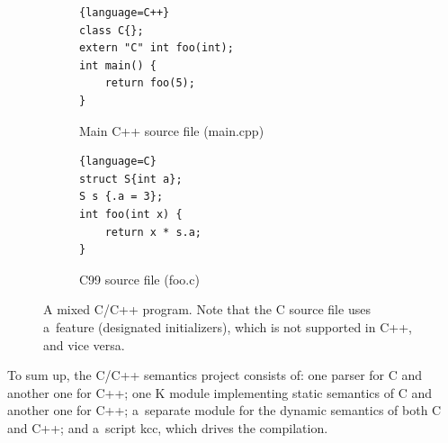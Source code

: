 \documentclass{fithesis3}
\begin{document}
\begin{figure}
\centering
\begin{subfigure}{.5\textwidth}
  \centering

\begin{lstlisting}{language=C++}
class C{};
extern "C" int foo(int);
int main() {
	return foo(5);
}
\end{lstlisting}

  \caption{Main C++ source file (main.cpp)}
\end{subfigure}%
\begin{subfigure}{.5\textwidth}
  \centering
\begin{lstlisting}{language=C}
struct S{int a};
S s {.a = 3};
int foo(int x) {
	return x * s.a;
}
\end{lstlisting}
  \caption{C99 source file (foo.c)}
\end{subfigure}
\caption{A mixed C/C++ program. Note that the C source file uses a~feature (designated initializers), which is not supported in C++, and vice versa.}
\label{fig:cpp-program-example}
\end{figure}


To sum up, the C/C++ semantics project consists of: one parser for C and another one for C++; one K module implementing static semantics of C and another one for C++; a~separate module for the dynamic semantics of both C and C++; and a~script kcc, which drives the compilation.




\end{document}
